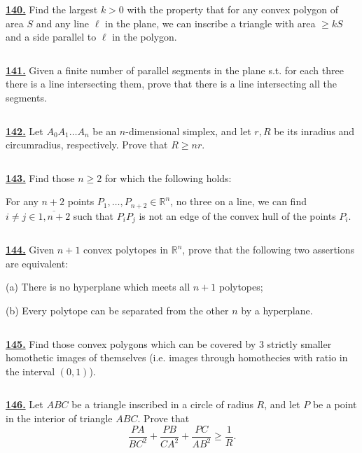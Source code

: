 \documentclass{article}
\newcommand{\plus}{+}
\begin{document}
$$ $$


\href{ http://www.artofproblemsolving.com/Forum/viewtopic.php?p=320556#p320556
}{\bf 140.} Find the largest $k>0$ with the property that for any convex polygon of area $S$ and any line $\ell$ in the plane, we can inscribe a triangle with area $\ge kS$ and a side parallel to $\ell$ in the polygon.


$$ $$


\href{ http://www.artofproblemsolving.com/Forum/viewtopic.php?p=324872#p324872
}{\bf 141.}  Given a finite number of parallel segments in the plane s.t. for each three there is a line intersecting them, prove that there is a line intersecting all the segments.


$$ $$


\href{ http://www.artofproblemsolving.com/Forum/viewtopic.php?p=397953#p397953
}{\bf 142.} Let $A_0A_1\ldots A_n$ be an $n$-dimensional simplex, and let $r,R$ be its inradius and circumradius, respectively. Prove that $R\ge nr$.


$$ $$


\href{ http://www.artofproblemsolving.com/Forum/viewtopic.php?p=415477#p415477
}{\bf 143.} Find those $n\ge 2$ for which the following holds:

For any $n+2$ points $P_1,\ldots,P_{n+2}\in\mathbb R^n$, no three on a line, we can find $i\ne j\in\overline{1,n+2}$ such that $P_iP_j$ is not an edge of the convex hull of the points $P_i$.


$$ $$

\href{ http://www.artofproblemsolving.com/Forum/viewtopic.php?p=434449#p434449
}{\bf 144.} Given $n+1$ convex polytopes in $\mathbb R^n$, prove that the following two assertions are equivalent:

(a) There is no hyperplane which meets all $n+1$ polytopes;

(b) Every polytope can be separated from the other $n$ by a hyperplane.


$$ $$


\href{ http://www.artofproblemsolving.com/Forum/viewtopic.php?p=475049#p475049
}{\bf 145.} Find those convex polygons which can be covered by $3$ strictly smaller homothetic images of themselves (i.e. images through homothecies with ratio in the interval $(0,1)$).


$$ $$


\href{ http://www.artofproblemsolving.com/Forum/viewtopic.php?p=20670#p20670 }{\bf 146.} Let $ ABC$ be a triangle inscribed in a circle of radius $ R$, and let $ P$ be a point in the interior of triangle $ ABC$. Prove that
$$\frac {PA}{BC^{2}} \plus{} \frac {PB}{CA^{2}} \plus{} \frac {PC}{AB^{2}}\ge \frac {1}{R}.$$
\end{document}

